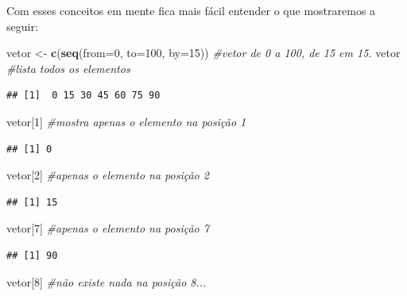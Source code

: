 \documentclass[]{book}
\newenvironment{Shaded}{\begin{snugshade}}{\end{snugshade}}
\newcommand{\KeywordTok}[1]{\textcolor[rgb]{0.13,0.29,0.53}{\textbf{#1}}}
\newcommand{\DataTypeTok}[1]{\textcolor[rgb]{0.13,0.29,0.53}{#1}}
\newcommand{\DecValTok}[1]{\textcolor[rgb]{0.00,0.00,0.81}{#1}}
\newcommand{\StringTok}[1]{\textcolor[rgb]{0.31,0.60,0.02}{#1}}
\newcommand{\CommentTok}[1]{\textcolor[rgb]{0.56,0.35,0.01}{\textit{#1}}}
\newcommand{\NormalTok}[1]{#1}
\begin{document}
Com esses conceitos em mente fica mais fácil entender o que mostraremos
a seguir:

\begin{Shaded}
\begin{Highlighting}[]
\NormalTok{vetor <-}\StringTok{ }\KeywordTok{c}\NormalTok{(}\KeywordTok{seq}\NormalTok{(}\DataTypeTok{from=}\DecValTok{0}\NormalTok{, }\DataTypeTok{to=}\DecValTok{100}\NormalTok{, }\DataTypeTok{by=}\DecValTok{15}\NormalTok{)) }\CommentTok{#vetor de 0 a 100, de 15 em 15.}
\NormalTok{vetor }\CommentTok{#lista todos os elementos}
\end{Highlighting}
\end{Shaded}

\begin{verbatim}
## [1]  0 15 30 45 60 75 90
\end{verbatim}

\begin{Shaded}
\begin{Highlighting}[]
\NormalTok{vetor[}\DecValTok{1}\NormalTok{] }\CommentTok{#mostra apenas o elemento na posição 1}
\end{Highlighting}
\end{Shaded}

\begin{verbatim}
## [1] 0
\end{verbatim}

\begin{Shaded}
\begin{Highlighting}[]
\NormalTok{vetor[}\DecValTok{2}\NormalTok{] }\CommentTok{#apenas o elemento na posição 2}
\end{Highlighting}
\end{Shaded}

\begin{verbatim}
## [1] 15
\end{verbatim}

\begin{Shaded}
\begin{Highlighting}[]
\NormalTok{vetor[}\DecValTok{7}\NormalTok{] }\CommentTok{#apenas o elemento na posição 7}
\end{Highlighting}
\end{Shaded}

\begin{verbatim}
## [1] 90
\end{verbatim}

\begin{Shaded}
\begin{Highlighting}[]
\NormalTok{vetor[}\DecValTok{8}\NormalTok{] }\CommentTok{#não existe nada na posição 8...}
\end{Highlighting}
\end{Shaded}
\end{document}
